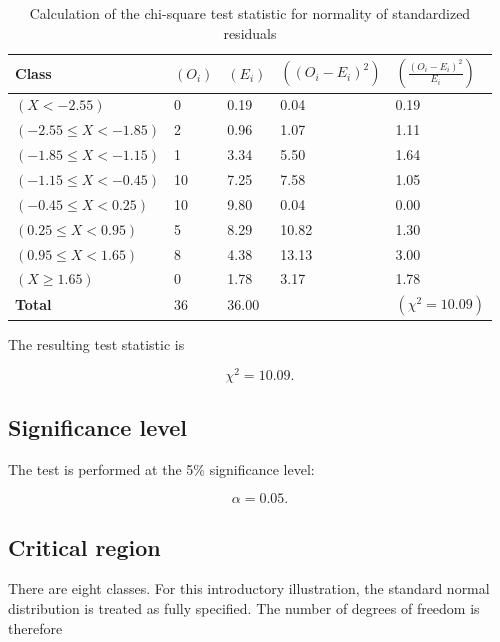 \begin{table}[htbp]
\centering
\begin{tabularx}{\textwidth}{@{}lYYYY@{}}
\toprule
\textbf{Class} &
$(O_i)$ &
$(E_i)$ &
$((O_i-E_i)^2)$ &
$(\frac{(O_i-E_i)^2}{E_i})$ \\
\midrule
$(X < -2.55)$              & 0  & 0.19 & 0.04  & 0.19 \\
$(-2.55 \leq X < -1.85)$  & 2  & 0.96 & 1.07  & 1.11 \\
$(-1.85 \leq X < -1.15)$  & 1  & 3.34 & 5.50  & 1.64 \\
$(-1.15 \leq X < -0.45)$  & 10 & 7.25 & 7.58  & 1.05 \\
$(-0.45 \leq X < 0.25)$   & 10 & 9.80 & 0.04  & 0.00 \\
$(0.25 \leq X < 0.95)$    & 5  & 8.29 & 10.82 & 1.30 \\
$(0.95 \leq X < 1.65)$    & 8  & 4.38 & 13.13 & 3.00 \\
$(X \geq 1.65)$            & 0  & 1.78 & 3.17  & 1.78 \\
\textbf{Total}             & 36 & 36.00 &       & $(\chi^2 = 10.09)$ \\
\bottomrule
\end{tabularx}
\caption{Calculation of the chi-square test statistic for normality of standardized residuals}
\label{tab:chi_square_residuals_normal}
\end{table}
The resulting test statistic is

\begin{equation*}
\chi^2 = 10.09.
\end{equation*}

\subsection{Significance level}

The test is performed at the 5\% significance level:

\begin{equation*}
\alpha = 0.05.
\end{equation*}

\subsection{Critical region}

There are eight classes. For this introductory illustration, the standard normal distribution is treated as fully specified. The number of degrees of freedom is therefore

